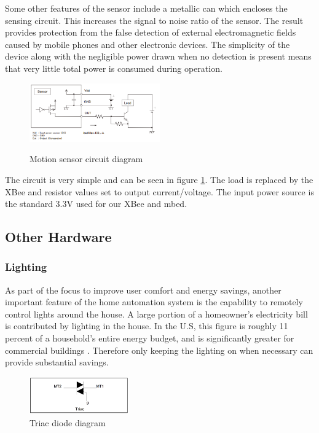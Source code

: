 \documentclass[10.5pt,a4paper,twoside]{report}   %
\begin{document}
Some other features of the sensor include a metallic can which encloses the sensing circuit. This increases the signal to noise ratio of the sensor. The result provides protection from the false detection of external electromagnetic fields caused by mobile phones and other electronic devices. The simplicity of the device along with the negligible power drawn when no detection is present means that very little total power is consumed during operation. 
\begin{figure}[h!]
  \vspace{-10pt}
  \caption{Motion sensor circuit diagram}
  \centering
    \includegraphics[width=0.5\textwidth]{images/motionsens_diag.png}
\label{fig:motsenscirc}
  \vspace{-10pt}
\end{figure}
The circuit is very simple and can be seen in figure \ref{fig:motsenscirc}. The load is replaced by the XBee and resistor values set to output current/voltage. The input power source is the standard 3.3V used for our XBee and mbed. 

\subsection{Other Hardware}
\subsubsection{Lighting}

As part of the focus to improve user comfort and energy savings, another important feature of the home automation system is the capability to remotely control lights around the house. A large portion of a homeowner's electricity bill is contributed by lighting in the house. In the U.S, this figure is roughly 11 percent of a household’s entire energy budget, and is significantly greater for commercial buildings \cite{DOElighting}. Therefore only keeping the lighting on when necessary can provide substantial savings. 

\begin{figure}
  \vspace{-20pt}
  \begin{center}
    \includegraphics[width=0.38\textwidth]{images/triac.png}
  \end{center}
  \vspace{-20pt}
  \caption{Triac diode diagram}
\label{fig:triac}
  \vspace{-10pt}
\end{figure}
\end{document}
